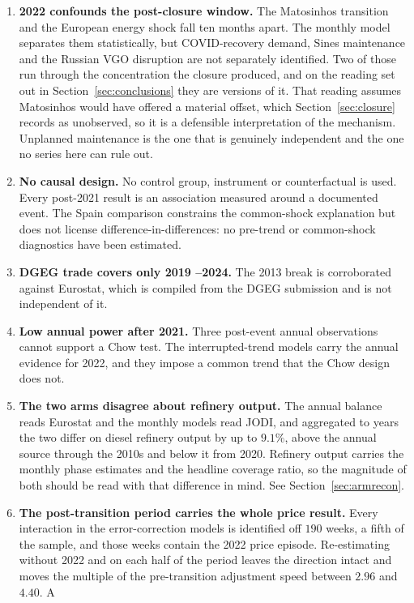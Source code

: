 \documentclass[11pt,a4paper]{article}
\begin{document}
\begin{enumerate} \item \textbf{2022 confounds the post-closure window.} The Matosinhos
transition and the European energy shock fall ten months apart. The monthly model separates them
statistically, but COVID-recovery demand, Sines maintenance and the Russian VGO disruption are
not separately identified. Two of those run through the concentration the closure produced, and
on the reading set out in Section~\ref{sec:conclusions} they are versions of it. That reading
assumes Matosinhos would have offered a material offset, which Section~\ref{sec:closure} records
as unobserved, so it is a defensible interpretation of the mechanism. Unplanned maintenance is
the one that is genuinely independent and the one no series here can rule out. \item \textbf{No
causal design.} No control group, instrument or counterfactual is used. Every post-2021 result
is an association measured around a documented event. The Spain comparison constrains the
common-shock explanation but does not license difference-in-differences: no pre-trend or
common-shock diagnostics have been estimated. \item \textbf{DGEG trade covers only 2019 --2024.}
The 2013 break is corroborated against Eurostat, which is compiled from the DGEG submission and
is not independent of it. \item \textbf{Low annual power after 2021.} Three post-event annual
observations cannot support a Chow test. The interrupted-trend models carry the annual evidence
for 2022, and they impose a common trend that the Chow design does not. \item \textbf{The two
arms disagree about refinery output.} The annual balance reads Eurostat and the monthly models
read JODI, and aggregated to years the two differ on diesel refinery output by up to $9.1\%$,
above the annual source through the 2010s and below it from 2020. Refinery output carries the
monthly phase estimates and the headline coverage ratio, so the magnitude of both should be read
with that difference in mind. See Section~\ref{sec:armrecon}. \item \textbf{The post-transition
period carries the whole price result.} Every interaction in the error-correction models is
identified off $190$ weeks, a fifth of the sample, and those weeks contain the 2022 price
episode. Re-estimating without 2022 and on each half of the period leaves the direction intact
and moves the multiple of the pre-transition adjustment speed between $2.96$ and $4.40$. A

\end{enumerate}
\end{document}
